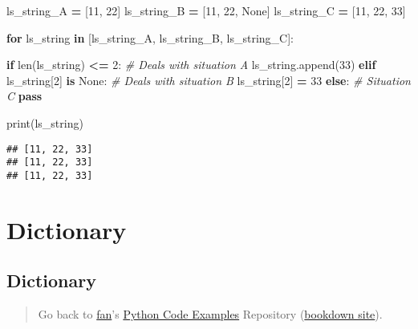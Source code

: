 \documentclass[
]{book}
\newenvironment{Shaded}{\begin{snugshade}}{\end{snugshade}}
\newcommand{\BuiltInTok}[1]{#1}
\newcommand{\CommentTok}[1]{\textcolor[rgb]{0.56,0.35,0.01}{\textit{#1}}}
\newcommand{\ControlFlowTok}[1]{\textcolor[rgb]{0.13,0.29,0.53}{\textbf{#1}}}
\newcommand{\DecValTok}[1]{\textcolor[rgb]{0.00,0.00,0.81}{#1}}
\newcommand{\KeywordTok}[1]{\textcolor[rgb]{0.13,0.29,0.53}{\textbf{#1}}}
\newcommand{\NormalTok}[1]{#1}
\newcommand{\OperatorTok}[1]{\textcolor[rgb]{0.81,0.36,0.00}{\textbf{#1}}}
\newcommand{\VariableTok}[1]{\textcolor[rgb]{0.00,0.00,0.00}{#1}}
\begin{document}
\begin{Shaded}
\begin{Highlighting}[]

\NormalTok{ls\_string\_A }\OperatorTok{=}\NormalTok{ [}\DecValTok{11}\NormalTok{, }\DecValTok{22}\NormalTok{]}
\NormalTok{ls\_string\_B }\OperatorTok{=}\NormalTok{ [}\DecValTok{11}\NormalTok{, }\DecValTok{22}\NormalTok{, }\VariableTok{None}\NormalTok{]}
\NormalTok{ls\_string\_C }\OperatorTok{=}\NormalTok{ [}\DecValTok{11}\NormalTok{, }\DecValTok{22}\NormalTok{, }\DecValTok{33}\NormalTok{]}

\ControlFlowTok{for}\NormalTok{ ls\_string }\KeywordTok{in}\NormalTok{ [ls\_string\_A, ls\_string\_B, ls\_string\_C]:}

  \ControlFlowTok{if} \BuiltInTok{len}\NormalTok{(ls\_string) }\OperatorTok{\textless{}=} \DecValTok{2}\NormalTok{:}
    \CommentTok{\# Deals with situation A}
\NormalTok{    ls\_string.append(}\DecValTok{33}\NormalTok{)}
  \ControlFlowTok{elif}\NormalTok{ ls\_string[}\DecValTok{2}\NormalTok{] }\KeywordTok{is} \VariableTok{None}\NormalTok{:}
    \CommentTok{\# Deals with situation B}
\NormalTok{    ls\_string[}\DecValTok{2}\NormalTok{] }\OperatorTok{=} \DecValTok{33}
  \ControlFlowTok{else}\NormalTok{:}
    \CommentTok{\# Situation C}
    \ControlFlowTok{pass}

  \BuiltInTok{print}\NormalTok{(ls\_string)}
\end{Highlighting}
\end{Shaded}

\begin{verbatim}
## [11, 22, 33]
## [11, 22, 33]
## [11, 22, 33]
\end{verbatim}

\hypertarget{dictionary}{%
\section{Dictionary}\label{dictionary}}

\hypertarget{dictionary-1}{%
\subsection{Dictionary}\label{dictionary-1}}

\begin{quote}
Go back to \href{http://fanwangecon.github.io/}{fan}'s \href{https://fanwangecon.github.io/pyfan/}{Python Code Examples} Repository (\href{https://fanwangecon.github.io/pyfan/bookdown}{bookdown site}).
\end{quote}
\end{document}
